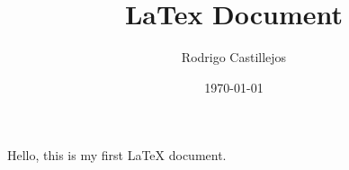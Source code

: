\documentclass{article}
\title{LaTex Document}
\author{Rodrigo Castillejos}
\date{\today}
\begin{document}
	\maketitle
	Hello, this is my first LaTeX document.
\end{document}
